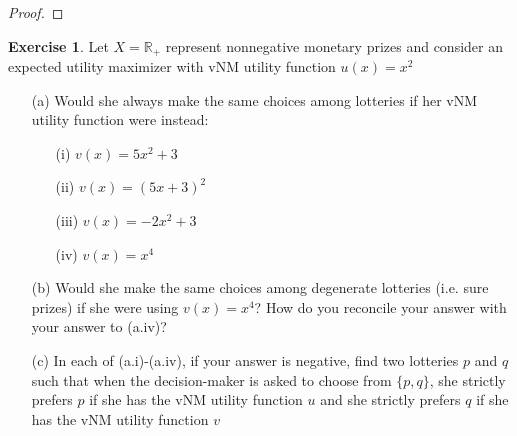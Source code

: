 \documentclass[11pt,oneside]{article}
\numberwithin{equation}{section}
\theoremstyle{definition}
\newtheorem{exercise}{Exercise}
\begin{document}
\begin{proof}






\end{proof}

\begin{exercise}

Let $X = {\mathbb{R}}_{+} $ represent nonnegative monetary prizes and consider an expected utility maximizer with vNM utility function $u(x) = x^2$

\begin{enumerate}

\item [(a)] Would she always make the same choices among lotteries if her vNM utility function were instead:

\begin{enumerate}

\item [(i)] $v(x) = 5x^2 + 3$
\item [(ii)] $v(x) = {(5x+3)}^2$
\item [(iii)] $v(x) = -2x^2 + 3$
\item [(iv)] $v(x) = x^4$



\end{enumerate}

\item[(b)] Would she make the same choices among degenerate lotteries (i.e. sure prizes) if she were using $v(x) = x^4$? How do you reconcile your answer with your answer to (a.iv)?

\item[(c)]  In each of (a.i)-(a.iv), if your answer is negative, find two lotteries $p$ and $q$ such that when the decision-maker is asked to choose from $\{p, q\}$, she strictly prefers $p$ if she has the vNM utility function $u$ and she strictly prefers $q$ if she has the vNM utility function $v$



\end{enumerate}



\end{exercise} 
\end{document}
